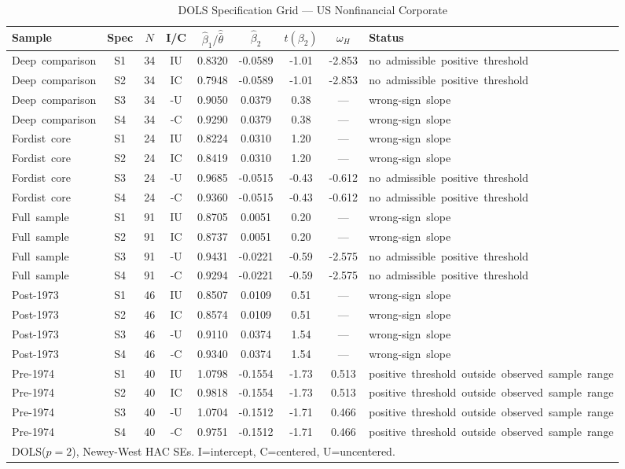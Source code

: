 \begin{table}[htbp]
\centering
\caption{DOLS Specification Grid --- US Nonfinancial Corporate}
\label{tab:dols_spec_grid_us}
\small
\begin{tabular}{l c c c c c c c l}
\hline
Sample & Spec & $N$ & I/C & $\hat{\beta}_1/\hat{\bar{\theta}}$ & $\hat{\beta}_2$ & $t(\beta_2)$ & $\omega_H$ & Status \\
\hline
Deep~comparison & S1 & 34 & IU & 0.8320 & -0.0589 & -1.01 & -2.853 & no~admissible~positive~threshold \\
Deep~comparison & S2 & 34 & IC & 0.7948 & -0.0589 & -1.01 & -2.853 & no~admissible~positive~threshold \\
Deep~comparison & S3 & 34 & -U & 0.9050 & 0.0379 & 0.38 & --- & wrong-sign~slope \\
Deep~comparison & S4 & 34 & -C & 0.9290 & 0.0379 & 0.38 & --- & wrong-sign~slope \\
Fordist~core & S1 & 24 & IU & 0.8224 & 0.0310 & 1.20 & --- & wrong-sign~slope \\
Fordist~core & S2 & 24 & IC & 0.8419 & 0.0310 & 1.20 & --- & wrong-sign~slope \\
Fordist~core & S3 & 24 & -U & 0.9685 & -0.0515 & -0.43 & -0.612 & no~admissible~positive~threshold \\
Fordist~core & S4 & 24 & -C & 0.9360 & -0.0515 & -0.43 & -0.612 & no~admissible~positive~threshold \\
Full~sample & S1 & 91 & IU & 0.8705 & 0.0051 & 0.20 & --- & wrong-sign~slope \\
Full~sample & S2 & 91 & IC & 0.8737 & 0.0051 & 0.20 & --- & wrong-sign~slope \\
Full~sample & S3 & 91 & -U & 0.9431 & -0.0221 & -0.59 & -2.575 & no~admissible~positive~threshold \\
Full~sample & S4 & 91 & -C & 0.9294 & -0.0221 & -0.59 & -2.575 & no~admissible~positive~threshold \\
Post-1973 & S1 & 46 & IU & 0.8507 & 0.0109 & 0.51 & --- & wrong-sign~slope \\
Post-1973 & S2 & 46 & IC & 0.8574 & 0.0109 & 0.51 & --- & wrong-sign~slope \\
Post-1973 & S3 & 46 & -U & 0.9110 & 0.0374 & 1.54 & --- & wrong-sign~slope \\
Post-1973 & S4 & 46 & -C & 0.9340 & 0.0374 & 1.54 & --- & wrong-sign~slope \\
Pre-1974 & S1 & 40 & IU & 1.0798 & -0.1554 & -1.73 & 0.513 & positive~threshold~outside~observed~sample~range \\
Pre-1974 & S2 & 40 & IC & 0.9818 & -0.1554 & -1.73 & 0.513 & positive~threshold~outside~observed~sample~range \\
Pre-1974 & S3 & 40 & -U & 1.0704 & -0.1512 & -1.71 & 0.466 & positive~threshold~outside~observed~sample~range \\
Pre-1974 & S4 & 40 & -C & 0.9751 & -0.1512 & -1.71 & 0.466 & positive~threshold~outside~observed~sample~range \\
\hline
\multicolumn{9}{l}{\footnotesize DOLS($p=2$), Newey-West HAC SEs. I=intercept, C=centered, U=uncentered.}
\end{tabular}
\end{table}
